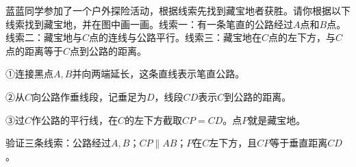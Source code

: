 蓝蓝同学参加了一个户外探险活动，根据线索先找到藏宝地者获胜。请你根据以下线索找到藏宝地，并在图中画一画。线索一：有一条笔直的公路经过\(A\)点和\(B\)点。线索二：藏宝地与\(C\)点的连线与公路平行。线索三：藏宝地在\(C\)点的左下方，与\(C\)点的距离等于\(C\)点到公路的距离。\par
{}
\begin{BookAnswer}
①连接黑点\(A,B\)并向两端延长，这条直线表示笔直公路。\par ②从\(C\)向公路作垂线段，记垂足为\(D\)，线段\(CD\)表示\(C\)到公路的距离。\par ③过\(C\)作公路的平行线，在\(C\)的左下方截取\(CP=CD\)。点\(P\)就是藏宝地。\par 验证三条线索：公路经过\(A,B\)；\allowbreak{}\(CP\parallel AB\)；\allowbreak{}\(P\)在\(C\)左下方，且\(CP\)等于垂直距离\(CD\)。
\end{BookAnswer}
